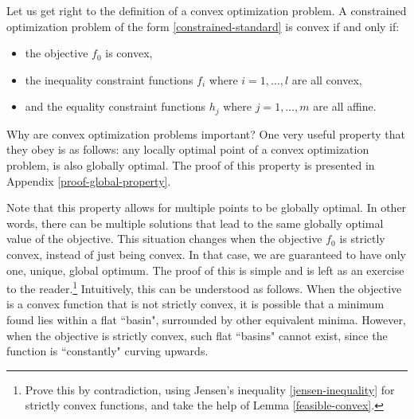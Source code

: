 \documentclass[a4paper]{article}
\theoremstyle{definition}
\begin{document}
Let us get right to the definition of a convex optimization problem.
A constrained optimization problem of the form \eqref{constrained-standard} is convex if and only if:
\begin{itemize}
	\item the objective $f_0$ is convex,
	\item the inequality constraint functions $f_i$ where $i = 1, \dots, l$ are all convex,
	\item and the equality constraint functions $h_j$ where $j = 1, \dots, m$ are all affine.
\end{itemize}

Why are convex optimization problems important?
One very useful property that they obey is as follows: any locally optimal point of a convex optimization problem, is also globally optimal.
The proof of this property is presented in Appendix \ref{proof-global-property}.


Note that this property allows for multiple points to be globally optimal.
In other words, there can be multiple solutions that lead to the same globally optimal value of the objective.
This situation changes when the objective $f_0$ is strictly convex, instead of just being convex.
In that case, we are guaranteed to have only one, unique, global optimum.
The proof of this is simple and is left as an exercise to the reader.\footnote{
	Prove this by contradiction, using Jensen's inequality \eqref{jensen-inequality} for strictly convex functions, and take the help of Lemma \ref{feasible-convex}.
}
Intuitively, this can be understood as follows.
When the objective is a convex function that is not strictly convex, it is possible that a minimum found lies within a flat ``basin", surrounded by other equivalent minima.
However, when the objective is strictly convex, such flat ``basins" cannot exist, since the function is ``constantly" curving upwards.
\end{document}

